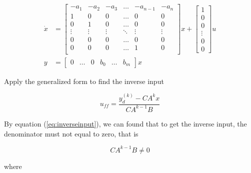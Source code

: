 \documentclass[12pt]{article}
\begin{document}
  \begin{align}
    \dot{x} &=
    \begin{bmatrix}
    -a_1   & -a_2   & -a_3   & \dots  & -a_{n-1} & -a_n   \\
    1      & 0      & 0      & \dots  & 0        & 0      \\
    0      & 1      & 0      & \dots  & 0        & 0      \\
    \vdots & \vdots & \vdots & \ddots & \vdots   & \vdots \\
    0      & 0      & 0      & \dots  & 0        & 0      \\
    0      & 0      & 0      & \dots  & 1        & 0      \\
    \end{bmatrix} x +
    \begin{bmatrix}
    1 \\ 0 \\ 0 \\ \vdots \\ 0 \\ 0
    \end{bmatrix} u \\
    y &=
    \begin{bmatrix}
    0 & \dots & 0 & b_0 & \dots & b_m
    \end{bmatrix} x
  \end{align}

  Apply the generalized form to find the inverse input

  \begin{equation}
    u_{ff} = \frac{y^{(k)}_d - CA^kx}{CA^{k-1}B}
    \label{eq:inverseinput}
  \end{equation}

  By equation (\ref{eq:inverseinput}), we can found that to get the inverse input, the denominator must not equal to zero, that is

  \begin{equation}
    CA^{k-1}B \neq 0
  \end{equation}

  where
\end{document}
